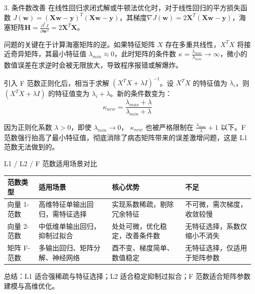 \documentclass[aspectratio=169]{beamer}
\begin{document}
\begin{frame}{3. 条件数改善}
    在线性回归求闭式解或牛顿法优化时，对于线性回归的平方损失函数 $J(\mathbf{w}) = (\mathbf{X}\mathbf{w} - \mathbf{y})^T(\mathbf{X}\mathbf{w} - \mathbf{y})$，其梯度$\nabla J(\mathbf{w}) = 2\mathbf{X}^T(\mathbf{X}\mathbf{w} - \mathbf{y})$，海塞矩阵$\mathbf{H} = \frac{\partial^2 J}{\partial \mathbf{w}^2} = 2\mathbf{X}^T\mathbf{X}$。
    
    问题的关键在于计算海塞矩阵的逆。如果特征矩阵 $X$ 存在多重共线性，$X^TX$ 将接近奇异矩阵，其最小特征值 $\lambda_{min} \approx 0$，此时矩阵的条件数 $\kappa = \frac{\lambda_{max}}{\lambda_{min}} \to \infty$，微小的数值误差在求逆时会被无限放大，导致程序报错或解爆炸。
    
    引入 F 范数正则化后，相当于求解 $(X^TX + \lambda I)^{-1}$。设 $X^TX$ 的特征值为 $\lambda_i$，则 $(X^TX + \lambda I)$ 的特征值变为 $\lambda_i + \lambda$。新的条件数变为：
    $$ \kappa_{new} = \frac{\lambda_{max} + \lambda}{\lambda_{min} + \lambda} $$
    
    因为正则化系数 $\lambda > 0$，即使 $\lambda_{min} \to 0$， $\kappa_{new}$ 也被严格限制在 $\frac{\lambda_{max}}{\lambda} + 1$ 以下。F 范数强行抬高了最小特征值，彻底消除了病态矩阵带来的误差激增问题，这是 L1 范数无法做到的。
\end{frame}

\begin{frame}{L1 / L2 / F 范数适用场景对比}
    \begin{table}
        \centering
        \small
        \renewcommand{\arraystretch}{1.35}
        \begin{tabular}{p{2.2cm}p{2.8cm}p{2.6cm}p{2.4cm}}
            \toprule
            \textbf{范数类型} & \textbf{适用场景} & \textbf{核心优势} & \textbf{不足} \\
            \midrule
            向量 1-范数 & 高维特征单输出回归，需特征选择 & 实现系数稀疏，剔除冗余特征 & 不可微，需次梯度，收敛较慢 \\
            \midrule
            向量 2-范数 & 中低维单输出回归，抑制过拟合 & 处处可微，优化稳定，改善条件数 & 无特征选择，系数仅缩小不消失 \\
            \midrule
            矩阵 F-范数 & 多输出回归、矩阵分解、神经网络 & 酉不变、梯度简单、数值稳定 & 无特征选择，仅适用于矩阵参数 \\
            \bottomrule
        \end{tabular}
    \end{table}
    \vspace{0.2cm}
    \footnotesize 总结：L1 适合强稀疏与特征选择；L2 适合稳定抑制过拟合；F 范数适合矩阵参数建模与高维优化。
\end{frame}
\end{document}

